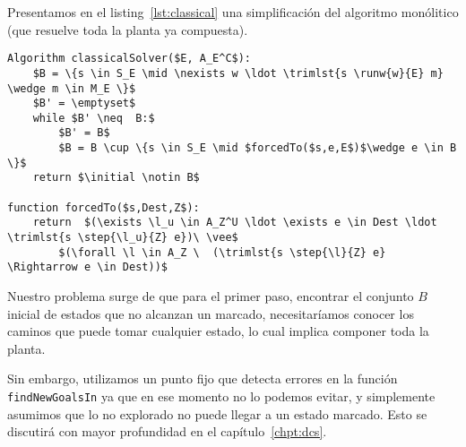 Presentamos en el listing~\ref{lst:classical} una simplificación del algoritmo monólitico (que resuelve toda la planta ya compuesta).

\begin{lstlisting}[language={pseudocode},label={lst:classical},caption={Algoritmo Monolítico},float=ht]
Algorithm classicalSolver($E, A_E^C$):
	$B = \{s \in S_E \mid \nexists w \ldot \trimlst{s \runw{w}{E} m} \wedge m \in M_E \}$
	$B' = \emptyset$
	while $B' \neq  B:$
		$B' = B$
		$B = B \cup \{s \in S_E \mid $forcedTo($s,e,E$)$\wedge e \in B \}$
	return $\initial \notin B$
	
function forcedTo($s,Dest,Z$):
	return  $(\exists \l_u \in A_Z^U \ldot \exists e \in Dest \ldot \trimlst{s \step{\l_u}{Z} e})\ \vee$
		$(\forall \l \in A_Z \  (\trimlst{s \step{\l}{Z} e} \Rightarrow e \in Dest))$    
\end{lstlisting}

Nuestro problema surge de que para el primer paso, encontrar el conjunto $B$ inicial de estados que no alcanzan un marcado, necesitaríamos conocer los caminos que puede tomar cualquier estado, lo cual implica componer toda la planta.

Sin embargo, utilizamos un punto fijo que detecta errores en la función \texttt{findNewGoalsIn} ya que en ese momento no lo podemos evitar, y simplemente asumimos que lo no explorado no puede llegar a un estado marcado. Esto se discutirá con mayor profundidad en el capítulo~\ref{chpt:dcs}.
